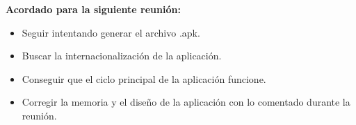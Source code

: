 \textbf{Acordado para la siguiente reunión:}

\begin{itemize}
\item Seguir intentando generar el archivo .apk.

\item Buscar la internacionalización de la aplicación.

\item Conseguir que el ciclo principal de la aplicación funcione.

\item Corregir la memoria y el diseño de la aplicación con lo comentado durante la reunión.
\end{itemize}